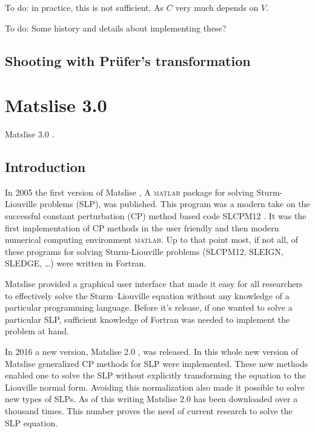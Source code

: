 {\color{red} To do: in practice, this is not sufficient. As $C$ very much depends on $V$.}

    {\color{red} To do: Some history and details about implementing these?}

\subsection{Shooting with Prüfer's transformation}\label{sec:c2_shooting_prufer}

\section{Matslise 3.0}


Matslise 3.0 \cite{baeyens_fast_2020}.

\subsection{Introduction}


In 2005 the first version of Matslise \cite{ledoux_matslise_2005}, A \textsc{matlab} package for solving Sturm-Liouville problems (SLP), was published. This program was a modern take on the successful
constant perturbation (CP) method based code SLCPM12 \cite{ixaru_slcpm12_1999}. It was the first implementation of CP
methods in the user friendly and then modern numerical computing environment \textsc{matlab}. Up to that
point most, if not all, of these programs for solving Sturm-Liouville problems (SLCPM12, SLEIGN, SLEDGE, \ldots) \cite{ixaru_slcpm12_1999,bailey_sleign2_2001,eastham_sledge_1996}
were written in Fortran.

Matslise provided a graphical user interface that made it easy for all
researchers to effectively solve the
Sturm--Liouville equation without any knowledge of a particular programming language. Before it's release, if one wanted to solve
a particular SLP, sufficient knowledge of Fortran was needed to implement the problem at hand.

In 2016 a new version, Matslise 2.0 \cite{ledoux_matslise_2016}, was
released. In this whole new version of Matslise generalized
CP methods for SLP were implemented. These new methods enabled one to solve the
SLP without explicitly transforming the equation to
the Liouville normal form. Avoiding this normalization also made it possible to solve new types of SLPs. As of this writing
Matslise 2.0 has been downloaded over a thousand times. This number proves the need of current research to solve the SLP
equation.

